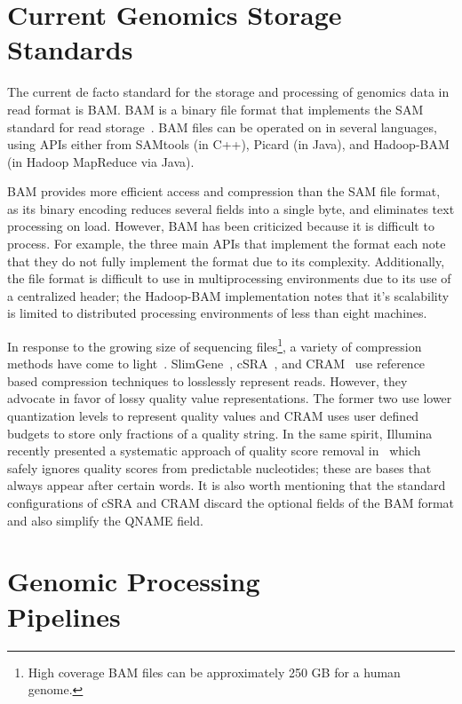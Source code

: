\documentclass[10pt,twocolumn]{article}
\theoremstyle{plain}
\begin{document}
\section{Current Genomics Storage Standards}
\label{sec:current-genomics-storage-standards}

The current de facto standard for the storage and processing of genomics data in read format is BAM. BAM is a binary file
format that implements the SAM standard for read storage~\cite{li09}. BAM files can be operated on in several languages,
using APIs either from SAMtools\cite{li09} (in C++), Picard\cite{picard} (in Java), and Hadoop-BAM\cite{niemenmaa12} (in Hadoop
MapReduce via Java). 

BAM provides more efficient access and compression than the SAM file format, as its binary
encoding reduces several fields into a single byte, and eliminates text processing on load. However, BAM has been
criticized because it is difficult to process. For example, the three main APIs that implement the format each note that they do not fully implement
the format due to its complexity. Additionally, the file format is difficult to use in multiprocessing environments due to its use
of a centralized header; the Hadoop-BAM implementation notes that it's scalability is limited to distributed processing
environments of less than eight machines.

In response to the growing size of sequencing files\footnote{High coverage BAM files can be approximately 250 GB for a human genome.},
a variety of compression methods have come to light~\cite{kozanitis2011, fritz11, WanBioinformatics, Popitsch2012, Asnani2012, CoxBW, 
recoil, Jones2012, Janin2013}. SlimGene~\cite{kozanitis2011}, cSRA~\cite{SRA}, and CRAM~\cite{fritz11} use reference based compression
techniques to losslessly represent reads. However, they advocate in favor of lossy quality value representations. The former two use lower
quantization levels to represent quality values and CRAM uses user defined budgets to store only fractions of a quality string. 
In the same spirit, Illumina recently presented a systematic approach of quality score removal in~\cite{Janin2013} which safely ignores
quality scores from predictable nucleotides; these are bases that always appear after certain words. It is also worth mentioning that the
standard configurations of cSRA and CRAM discard the optional fields of the BAM format and also simplify the QNAME field. 

\section{Genomic Processing\\Pipelines}
\label{sec:genomic-processing-pipelines}
\end{document}
